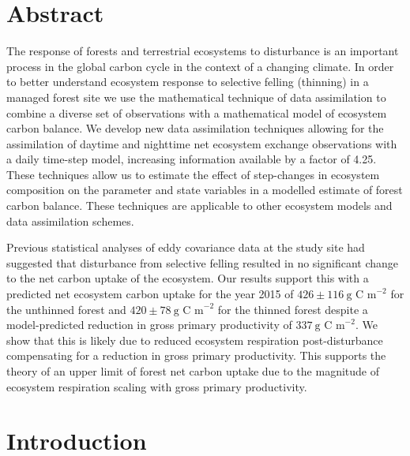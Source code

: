 
\section{Abstract}
The response of forests and terrestrial ecosystems to disturbance is an important process in the global carbon cycle in the context of a changing climate. In order to better understand ecosystem response to selective felling (thinning) in a managed forest site we use the mathematical technique of data assimilation to combine a diverse set of observations with a mathematical model of ecosystem carbon balance. We develop new data assimilation techniques allowing for the assimilation of daytime and nighttime net ecosystem exchange observations with a daily time-step model, increasing information available by a factor of 4.25. These techniques allow us to estimate the effect of step-changes in ecosystem composition on the parameter and state variables in a modelled estimate of forest carbon balance. These techniques are applicable to other ecosystem models and data assimilation schemes. 

Previous statistical analyses of eddy covariance data at the study site had suggested that disturbance from selective felling resulted in no significant change to the net carbon uptake of the ecosystem. Our results support this with a predicted net ecosystem carbon uptake for the year 2015 of \(426 \pm 116~\text{g C m}^{-2}\) for the unthinned forest and \(420 \pm 78~\text{g C m}^{-2}\) for the thinned forest despite a model-predicted reduction in gross primary productivity of \(337~\text{g C m}^{-2}\). We show that this is likely due to reduced ecosystem respiration post-disturbance compensating for a reduction in gross primary productivity. This supports the theory of an upper limit of forest net carbon uptake due to the magnitude of ecosystem respiration scaling with gross primary productivity. 


\section{Introduction}

